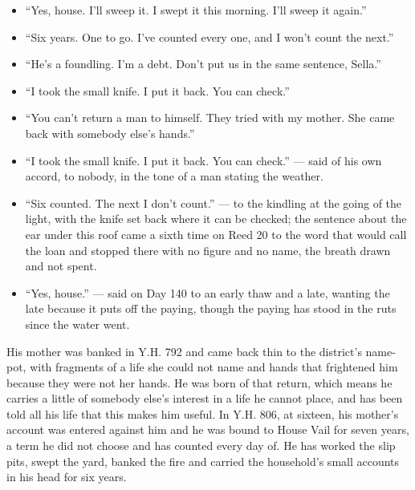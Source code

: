 \documentclass{design/chronicle}
\begin{document}
{\begin{itemize}[leftmargin=1.4em,itemsep=1pt,topsep=3pt,parsep=0pt]

\item “Yes, house. I’ll sweep it. I swept it this morning. I’ll sweep it again.”

\item “Six years. One to go. I’ve counted every one, and I won’t count the next.”

\item “He’s a foundling. I’m a debt. Don’t put us in the same sentence, Sella.”

\item “I took the small knife. I put it back. You can check.”

\item “You can’t return a man to himself. They tried with my mother. She came back with somebody else’s hands.”

\item “I took the small knife. I put it back. You can check.” --- said of his own accord, to nobody, in the tone of a man stating the weather.

\item “Six counted. The next I don’t count.” --- to the kindling at the going of the light, with the knife set back where it can be checked; the sentence about the ear under this roof came a sixth time on Reed 20 to the word that would call the loan and stopped there with no figure and no name, the breath drawn and not spent.

\item “Yes, house.” --- said on Day 140 to an early thaw and a late, wanting the late because it puts off the paying, though the paying has stood in the ruts since the water went.

\end{itemize}

His mother was banked in Y.H. 792 and came back thin to the district’s name-pot, with fragments of a life she could not name and hands that frightened him because they were not her hands. He was born of that return, which means he carries a little of somebody else’s interest in a life he cannot place, and has been told all his life that this makes him useful. In Y.H. 806, at sixteen, his mother’s account was entered against him and he was bound to House Vail for seven years, a term he did not choose and has counted every day of. He has worked the slip pits, swept the yard, banked the fire and carried the household’s small accounts in his head for six years.

}
\end{document}
